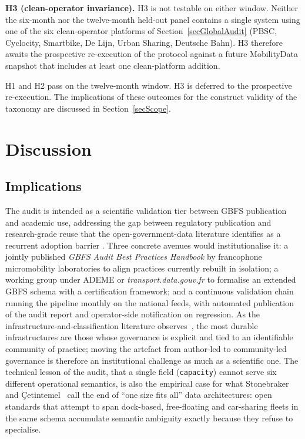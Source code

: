 \documentclass[11pt,a4paper]{article}
\begin{document}
\textbf{H3 (clean-operator invariance).} H3 is not
testable on either window. Neither the six-month nor the
twelve-month held-out panel contains a single system using one
of the six clean-operator platforms of
Section~\ref{secGlobalAudit} (PBSC, Cyclocity, Smartbike,
De Lijn, Urban Sharing, Deutsche Bahn). H3 therefore awaits
the prospective re-execution of the protocol against a future
MobilityData snapshot that includes at least one clean-platform
addition.

H1 and H2 pass on the twelve-month window. H3 is deferred to the
prospective re-execution. The implications of these outcomes for
the construct validity of the taxonomy are discussed in
Section~\ref{secScope}.


\section{Discussion}\label{secDiscussion}

\subsection{Implications}
The audit is intended as a scientific validation tier between GBFS
publication and academic use, addressing the gap between regulatory
publication and research-grade reuse that the open-government-data
literature identifies as a recurrent adoption barrier
\cite{Janssen2012OpenData}. Three concrete avenues would
institutionalise it: a jointly published \emph{GBFS Audit Best
Practices Handbook} by francophone micromobility laboratories to
align practices currently rebuilt in isolation; a working group
under ADEME or \emph{transport.data.gouv.fr} to formalise an
extended GBFS schema with a certification framework; and a
continuous validation chain running the pipeline monthly on the
national feeds, with automated publication of the audit report and
operator-side notification on regression. As the infrastructure-and-classification
literature observes~\cite{Star2010,Bowker2000}, the most durable
infrastructures are those whose governance is explicit and tied to an
identifiable community of practice; moving the artefact from author-led to community-led
governance is therefore an institutional challenge as much as a
scientific one. The technical lesson of the audit, that a single
field (\texttt{capacity}) cannot serve six different operational
semantics, is also the empirical case for what Stonebraker and
\c{C}etintemel~\cite{Stonebraker2005OneSize} call the end of
``one size fits all'' data architectures: open standards that
attempt to span dock-based, free-floating and car-sharing fleets in
the same schema accumulate semantic ambiguity exactly because they
refuse to specialise.
\end{document}
